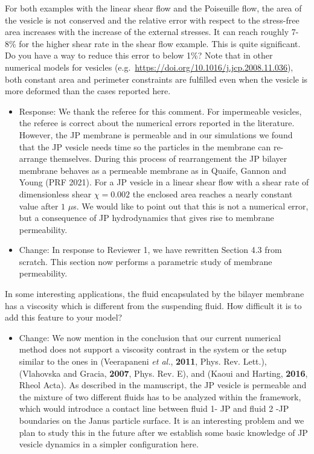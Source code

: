 \documentclass[11pt]{article}
\newcommand{\comment}[1]{{\color{blue} #1}}
\begin{document}
\noindent
\comment{For both examples with the linear shear flow and the Poiseuille
flow, the area of the vesicle is not conserved and the relative error
with respect to the stress-free area increases with the increase of the
external stresses. It can reach roughly 7-8\% for the higher shear rate
in the shear flow example. This is quite significant. Do you have a way
to reduce this error to below 1\%? Note that in other numerical models
for vesicles (e.g.~\url{https://doi.org/10.1016/j.jcp.2008.11.036}),
both constant area and perimeter constraints are fulfilled even when the
vesicle is more deformed than the cases reported here.}
\begin{itemize}
\item Response: We thank the referee for this comment. For impermeable vesicles, the referee is correct about the numerical errors reported in the literature. However, the JP membrane is permeable and in our simulations we found that the
  JP vesicle needs time so the particles in the membrane can re-arrange themselves. During this process of rearrangement the JP bilayer membrane behaves as a permeable membrane as in Quaife, Gannon and Young (PRF 2021). For a JP vesicle in a linear shear flow with a shear rate of dimensionless shear $\chi = 0.002$ the enclosed area reaches a nearly constant value after $1$ $\mu$s. We would like to point out that this is not a numerical error, but a consequence of JP hydrodynamics that gives rise to membrane permeability.

\item Change: In response to Reviewer 1, we have rewritten Section 4.3 from scratch.
  This section now performs a parametric study of membrane permeability.
\end{itemize}

\noindent
\comment{In some interesting applications, the fluid encapsulated by the
bilayer membrane has a viscosity which is different from the suspending
fluid. How difficult it is to add this feature to your model?}
\begin{itemize}
\item Change:
  We now mention in the conclusion that our current numerical method does not support a viscosity contrast in the system 
or the setup similar to the ones in (Veerapaneni {\sl et al.}, {\bf 2011}, Phys. Rev. Lett.),
(Vlahovska and Gracia, {\bf 2007}, Phys. Rev. E), and
(Kaoui and Harting, {\bf 2016}, Rheol Acta). 
As described in the manuscript, the JP vesicle is permeable and the mixture of two different
fluids has to be analyzed within the framework, which would introduce a contact line between fluid 1- JP and fluid 2 -JP boundaries on the Janus particle surface. It is an interesting problem and we plan to study this in the future after we establish some basic knowledge of JP vesicle dynamics in a simpler configuration here.

\end{itemize}
\end{document}
